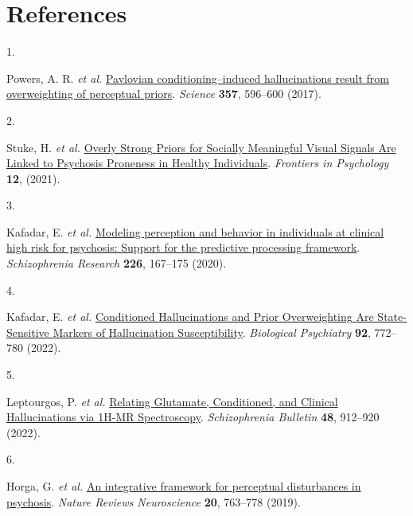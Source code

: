 \documentclass[
]{article}
\newlength{\cslhangindent}
\newlength{\csllabelwidth}
\newlength{\cslentryspacingunit} %
\newenvironment{CSLReferences}[2] %
 {%
  \setlength{\parindent}{0pt}
  \ifodd #1
  \let\oldpar\par
  \def\par{\hangindent=\cslhangindent\oldpar}
  \fi
  \setlength{\parskip}{#2\cslentryspacingunit}
 }%
 {}
\newcommand{\CSLLeftMargin}[1]{\parbox[t]{\csllabelwidth}{#1}}
\newcommand{\CSLRightInline}[1]{\parbox[t]{\linewidth - \csllabelwidth}{#1}\break}
\begin{document}
\newpage

\hypertarget{references}{%
\section*{References}\label{references}}

\hypertarget{refs}{}
\begin{CSLReferences}{0}{0}
\leavevmode{}%
\CSLLeftMargin{1. }%
\CSLRightInline{Powers, A. R. \emph{et al.}
\href{https://doi.org/10.1126/science.aan3458}{Pavlovian
conditioning--induced hallucinations result from overweighting of
perceptual priors}. \emph{Science} \textbf{357}, 596--600 (2017).}

\leavevmode{}%
\CSLLeftMargin{2. }%
\CSLRightInline{Stuke, H. \emph{et al.}
\href{https://doi.org/10.3389/fpsyg.2021.583637}{Overly {Strong}
{Priors} for {Socially} {Meaningful} {Visual} {Signals} {Are} {Linked}
to {Psychosis} {Proneness} in {Healthy} {Individuals}}. \emph{Frontiers
in Psychology} \textbf{12}, (2021).}

\leavevmode{}%
\CSLLeftMargin{3. }%
\CSLRightInline{Kafadar, E. \emph{et al.}
\href{https://doi.org/10.1016/j.schres.2020.04.017}{Modeling perception
and behavior in individuals at clinical high risk for psychosis:
{Support} for the predictive processing framework}. \emph{Schizophrenia
Research} \textbf{226}, 167--175 (2020).}

\leavevmode{}%
\CSLLeftMargin{4. }%
\CSLRightInline{Kafadar, E. \emph{et al.}
\href{https://doi.org/10.1016/j.biopsych.2022.05.007}{Conditioned
{Hallucinations} and {Prior} {Overweighting} {Are} {State}-{Sensitive}
{Markers} of {Hallucination} {Susceptibility}}. \emph{Biological
Psychiatry} \textbf{92}, 772--780 (2022).}

\leavevmode{}%
\CSLLeftMargin{5. }%
\CSLRightInline{Leptourgos, P. \emph{et al.}
\href{https://doi.org/10.1093/schbul/sbac006}{Relating {Glutamate},
{Conditioned}, and {Clinical} {Hallucinations} via {1H}-{MR}
{Spectroscopy}}. \emph{Schizophrenia Bulletin} \textbf{48}, 912--920
(2022).}

\leavevmode{}%
\CSLLeftMargin{6. }%
\CSLRightInline{Horga, G. \emph{et al.}
\href{https://doi.org/10.1038/s41583-019-0234-1}{An integrative
framework for perceptual disturbances in psychosis}. \emph{Nature
Reviews Neuroscience} \textbf{20}, 763--778 (2019).}


\end{CSLReferences}
\end{document}
